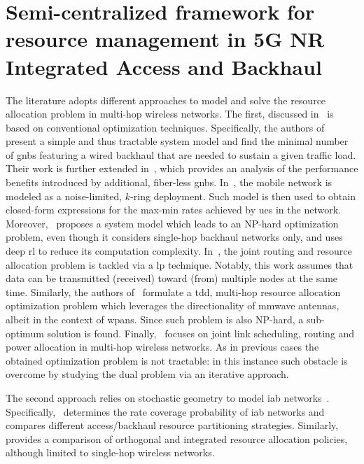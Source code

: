 
\section{Semi-centralized framework for resource management in 5G NR Integrated Access and Backhaul}
\label{sec:iab-res-man}

The literature adopts different approaches to model and solve the resource allocation problem in multi-hop wireless networks. 
The first, discussed in~\cite{qualcomm1, qualcomm2, kulkarni2018max, lei2020deep, rasekh2015interference, bilal2014time, cruz2003optimal} is based on conventional optimization techniques.
Specifically, the authors of~\cite{qualcomm1} present a simple and thus tractable system model and find the minimal number of \glspl{gnb} featuring a wired backhaul that are needed to sustain a given traffic load. Their work is further extended in~\cite{qualcomm2}, which provides an analysis of the performance benefits introduced by additional, fiber-less \glspl{gnb}. 
In~\cite{kulkarni2018max}, the mobile network is modeled as a noise-limited, $k$-ring deployment. Such model is then used to obtain closed-form expressions for the max-min rates achieved by \glspl{ue} in the network. Moreover,~\cite{lei2020deep} proposes a system model which leads to an NP-hard optimization problem, even though it considers single-hop backhaul networks only, and uses deep \gls{rl} to reduce its computation complexity. In~\cite{rasekh2015interference}, the joint routing and resource allocation problem is tackled via a \gls{lp} technique. Notably, this work assumes that data can be transmitted (received) toward (from) multiple nodes at the same time.
Similarly, the authors of~\cite{bilal2014time} formulate a \gls{tdd}, multi-hop resource allocation optimization problem which leverages the directionality of \gls{mmwave} antennas, albeit in the context of \gls{wpans}. Since such problem is also NP-hard, a sub-optimum solution is found. Finally,~\cite{cruz2003optimal} focuses on joint link scheduling, routing and power allocation in multi-hop wireless networks. As in previous cases the obtained optimization problem is not tractable: in this instance such obstacle is overcome by studying the dual problem via an iterative approach.

The second approach relies on stochastic geometry to model \gls{iab} networks~\cite{stoch_geom1, stoch_geom2}. Specifically,~\cite{stoch_geom1} determines the rate coverage probability of \gls{iab} networks and compares different access/backhaul resource partitioning strategies. Similarly,~\cite{stoch_geom2} provides a comparison of orthogonal and integrated resource allocation policies, although limited to single-hop wireless networks.  

